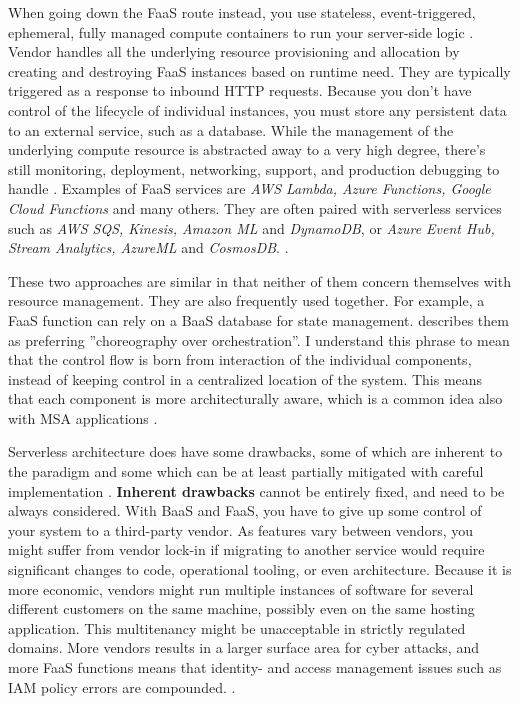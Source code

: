 \documentclass[utf8,english]{gradu3}
\begin{document}
When going down the FaaS route instead, you use stateless, event-triggered,
ephemeral, fully managed compute containers to run your server-side logic
\parencite{Roberts2018}. Vendor handles all the underlying resource provisioning
and allocation by creating and destroying FaaS instances based on runtime need.
They are typically triggered as a response to inbound HTTP requests. Because you
don't have control of the lifecycle of individual instances, you must store any
persistent data to an external service, such as a database. While the management
of the underlying compute resource is abstracted away to a very high degree,
there's still monitoring, deployment, networking, support, and production
debugging to handle \parencite{Roberts2018}. Examples of FaaS services are
\textit{AWS Lambda, Azure Functions, Google Cloud Functions} and many others.
They are often paired with serverless services such as \textit{AWS SQS, Kinesis,
  Amazon ML} and \textit{DynamoDB}, or \textit{Azure Event Hub, Stream Analytics,
  AzureML} and \textit{CosmosDB}.  \parencite[17]{Gannon2017}.

These two approaches are similar in that neither of them concern themselves with
resource management. They are also frequently used together. For example, a FaaS
function can rely on a BaaS database for state management.
\textcite{Roberts2018} describes them as preferring ''choreography over
orchestration''. I understand this phrase to mean that the control flow is born
from interaction of the individual components, instead of keeping control in a
centralized location of the system.  This means that each component is more
architecturally aware, which is a common idea also with MSA applications
\parencite{Roberts2018}.

Serverless architecture does have some drawbacks, some of which are inherent to
the paradigm and some which can be at least partially mitigated with careful
implementation \parencite{Roberts2018}. \textbf{Inherent drawbacks} cannot be
entirely fixed, and need to be always considered. With BaaS and FaaS, you have
to give up some control of your system to a third-party vendor. As features vary
between vendors, you might suffer from vendor lock-in if migrating to another
service would require significant changes to code, operational tooling, or even
architecture. Because it is more economic, vendors might run multiple instances
of software for several different customers on the same machine, possibly even
on the same hosting application. This multitenancy might be unacceptable in
strictly regulated domains. More vendors results in a larger surface area for
cyber attacks, and more FaaS functions means that identity- and access
management issues such as IAM policy errors are compounded.
\parencite{Roberts2018}.
\end{document}
